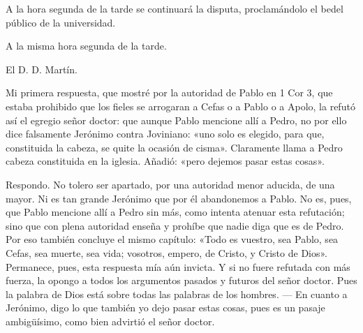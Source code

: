 A la hora segunda de la tarde se continuará la disputa, proclamándolo el bedel público de la universidad.

A la misma hora segunda de la tarde.

El D. D. Martín.

Mi primera respuesta, que mostré por la autoridad de Pablo en 1 Cor 3, que estaba prohibido que los fieles se arrogaran a Cefas o a Pablo o a Apolo, la refutó así el egregio señor doctor: que aunque Pablo mencione allí a Pedro, no por ello dice falsamente Jerónimo contra Joviniano: «uno solo es elegido, para que, constituida la cabeza, se quite la ocasión de cisma». Claramente llama a Pedro cabeza constituida en la iglesia. Añadió: «pero dejemos pasar estas cosas».

Respondo. No tolero ser apartado, por una autoridad menor aducida, de una mayor. Ni es tan grande Jerónimo que por él abandonemos a Pablo. No es, pues, que Pablo mencione allí a Pedro sin más, como intenta atenuar esta refutación; sino que con plena autoridad enseña y prohíbe que nadie diga que es de Pedro. Por eso también concluye el mismo capítulo: «Todo es vuestro, sea Pablo, sea Cefas, sea muerte, sea vida; vosotros, empero, de Cristo, y Cristo de Dios». Permanece, pues, esta respuesta mía aún invicta. Y si no fuere refutada con más fuerza, la opongo a todos los argumentos pasados y futuros del señor doctor. Pues la palabra de Dios está sobre todas las palabras de los hombres. — En cuanto a Jerónimo, digo lo que también yo dejo pasar estas cosas, pues es un pasaje ambigüísimo, como bien advirtió el señor doctor.

